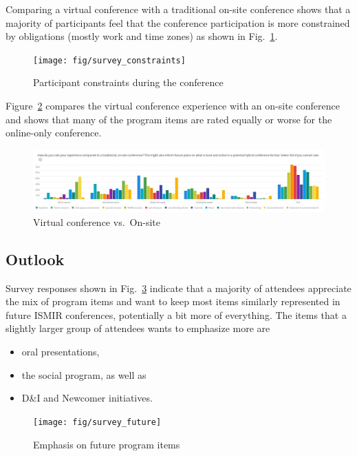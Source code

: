 \documentclass[%
10pt,								%
titlepage,						%
]
{scrartcl}
\begin{document}
        Comparing a virtual conference with a traditional on-site conference shows that a majority of participants feel that the conference participation is more constrained by obligations (mostly work and time zones) as shown in Fig.~\ref{fig:survey_constraints}.
         \begin{figure}%
            \centering
            \texttt{[image: fig/survey\_constraints]}%
            \caption{Participant constraints during the conference}%
            \label{fig:survey_constraints}%
        \end{figure}
        
        Figure~\ref{fig:survey_onsite} compares the virtual conference experience with an on-site conference and shows that many of the program items are rated equally or worse for the online-only conference.
          \begin{figure}%
            \centering
            \includegraphics[width=\columnwidth]{fig/survey_onsite}%
            \caption{Virtual conference vs.\ On-site}%
            \label{fig:survey_onsite}%
        \end{figure}

    \subsection{Outlook}
        Survey responses shown in Fig.~\ref{fig:survey_future} indicate that a majority of attendees appreciate the mix of program items and want to keep most items similarly represented in future ISMIR conferences, potentially a bit more of everything. The items that a slightly larger group of attendees wants to emphasize more are 
        \begin{itemize}
            \item   oral presentations,
            \item   the social program, as well as 
            \item   D\&I and Newcomer initiatives.
        \end{itemize}
          \begin{figure}%
            \centering
            \texttt{[image: fig/survey\_future]}%
            \caption{Emphasis on future program items}%
            \label{fig:survey_future}%
        \end{figure}
\end{document}
